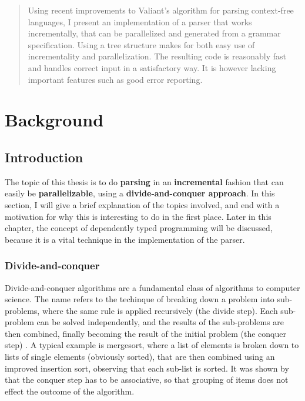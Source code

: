 \documentclass[a4paper,12pt,twosided]{report}
\renewcommand\cite{\citep}
\begin{document}


\begin{abstract}
Using recent improvements to Valiant's algorithm for parsing context-free
languages, I present an implementation of a parser that works incrementally,
that can be parallelized and generated from a grammar specification. Using a
tree structure makes for both easy use of incrementality and parallelization.
The resulting code is reasonably fast and handles correct input in a
satisfactory way. It is however lacking important features such as good error
reporting.
\end{abstract}

\tableofcontents

%
%

\chapter{Background}

\section{Introduction}
The topic of this thesis is to do \textbf{parsing} in an \textbf{incremental}
fashion that can easily be \textbf{parallelizable}, using a
\textbf{divide-and-conquer approach}. In this section, I will give a brief
explanation of the topics involved, and end with a motivation for why this is
interesting to do in the first place. Later in this chapter, the concept of
dependently typed programming will be discussed, because it is a vital technique
in the implementation of the parser.

\subsection{Divide-and-conquer}
Divide-and-conquer algorithms are a fundamental class of algorithms to computer
science. The name refers to the techinque of breaking down a problem into
sub-problems, where the same rule is applied recursively (the divide step). Each
sub-problem can be solved independently, and the results of the sub-problems are
then combined, finally becoming the result of the initial problem (the conquer
step) \cite[p.209]{algorithmdesign}. A typical example is mergesort, where a
list of elements is broken down to lists of single elements (obviously sorted),
that are then combined using an improved insertion sort, observing that each
sub-list is sorted. It was shown by \citet{birdlists} that the conquer step has
to be associative, so that grouping of items does not effect the outcome of the
algorithm. 
\end{document}
